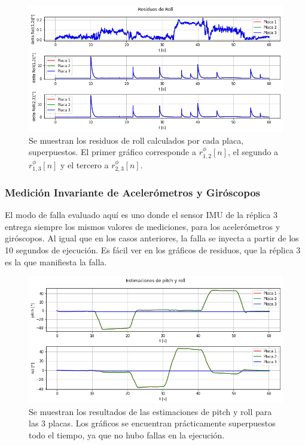\begin{figure}[H]
    \centering
    \includegraphics[width=\textwidth]{img/resultados_residuos_roll_saltos_aleatorios.png}
    \caption{Se muestran los residuos de roll calculados por cada placa, superpuestos. El primer gráfico corresponde a $r_{1,2}^{\phi}[n]$, el segundo a $r_{1,3}^{\phi}[n]$ y el tercero a $r_{2,3}^{\phi}[n]$.}
    \label{fig:resultados_residuos_roll_saltos_aleatorios}
\end{figure}


\subsubsection{Medición Invariante de Acelerómetros y Giróscopos}

El modo de falla evaluado aquí es uno donde el sensor IMU de la réplica 3 entrega siempre los mismos valores de mediciones, para los acelerómetros y giróscopos. Al igual que en los casos anteriores, la falla se inyecta a partir de los 10 segundos de ejecución. Es fácil ver en los gráficos de residuos, que la réplica 3 es la que manifiesta la falla.

\begin{figure}[H]
    \centering
    \includegraphics[width=\textwidth]{img/resultados_pitch_roll_enclavado.png}
    \caption{Se muestran los resultados de las estimaciones de pitch y roll para las 3 placas. Los gráficos se encuentran prácticamente superpuestos todo el tiempo, ya que no hubo fallas en la ejecución.}
    \label{fig:resultados_pitch_roll_enclavado}
\end{figure}

